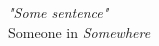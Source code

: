 


\null
\vskip5cm
\begin{flushright}
     \textit{"Some sentence"}		\\[10pt]
  Someone in \textit{Somewhere}
\end{flushright}
\vfill
\newpage
